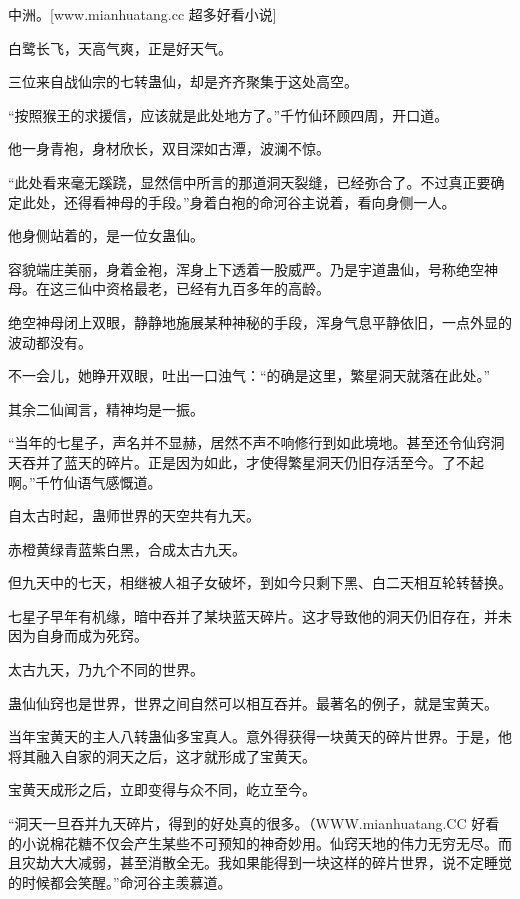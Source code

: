 
\begin{this_body}

中洲。[www.mianhuatang.cc 超多好看小说]

白鹭长飞，天高气爽，正是好天气。

三位来自战仙宗的七转蛊仙，却是齐齐聚集于这处高空。

“按照猴王的求援信，应该就是此处地方了。”千竹仙环顾四周，开口道。

他一身青袍，身材欣长，双目深如古潭，波澜不惊。

“此处看来毫无蹊跷，显然信中所言的那道洞天裂缝，已经弥合了。不过真正要确定此处，还得看神母的手段。”身着白袍的命河谷主说着，看向身侧一人。

他身侧站着的，是一位女蛊仙。

容貌端庄美丽，身着金袍，浑身上下透着一股威严。乃是宇道蛊仙，号称绝空神母。在这三仙中资格最老，已经有九百多年的高龄。

绝空神母闭上双眼，静静地施展某种神秘的手段，浑身气息平静依旧，一点外显的波动都没有。

不一会儿，她睁开双眼，吐出一口浊气：“的确是这里，繁星洞天就落在此处。”

其余二仙闻言，精神均是一振。

“当年的七星子，声名并不显赫，居然不声不响修行到如此境地。甚至还令仙窍洞天吞并了蓝天的碎片。正是因为如此，才使得繁星洞天仍旧存活至今。了不起啊。”千竹仙语气感慨道。

自太古时起，蛊师世界的天空共有九天。

赤橙黄绿青蓝紫白黑，合成太古九天。

但九天中的七天，相继被人祖子女破坏，到如今只剩下黑、白二天相互轮转替换。

七星子早年有机缘，暗中吞并了某块蓝天碎片。这才导致他的洞天仍旧存在，并未因为自身而成为死窍。

太古九天，乃九个不同的世界。

蛊仙仙窍也是世界，世界之间自然可以相互吞并。最著名的例子，就是宝黄天。

当年宝黄天的主人八转蛊仙多宝真人。意外得获得一块黄天的碎片世界。于是，他将其融入自家的洞天之后，这才就形成了宝黄天。

宝黄天成形之后，立即变得与众不同，屹立至今。

“洞天一旦吞并九天碎片，得到的好处真的很多。（WWW.mianhuatang.CC 好看的小说棉花糖不仅会产生某些不可预知的神奇妙用。仙窍天地的伟力无穷无尽。而且灾劫大大减弱，甚至消散全无。我如果能得到一块这样的碎片世界，说不定睡觉的时候都会笑醒。”命河谷主羡慕道。


\end{this_body}
